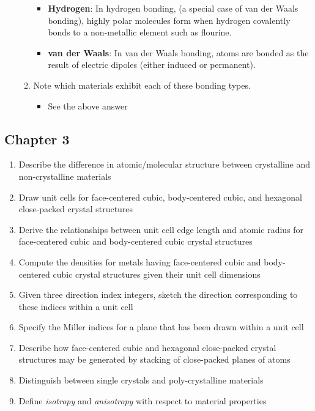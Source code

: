 \documentclass{article}
\begin{document}
\begin{enumerate}
\begin{enumerate}
\begin{itemize}
            \item \textbf{Hydrogen}: In hydrogen bonding, (a special case of van der Waals bonding), highly polar molecules form when hydrogen covalently bonds to a non-metallic element such as flourine.
            \item \textbf{van der Waals}: In van der Waals bonding, atoms are bonded as the result of electric dipoles (either induced or permanent).
        \end{itemize}
        \item Note which materials exhibit each of these bonding types.
        \begin{itemize}
            \item See the above answer
        \end{itemize}
    \end{enumerate}
\end{enumerate}

\subsection{Chapter 3}

\begin{enumerate}
    \item Describe the difference in atomic/molecular structure between crystalline and non-crystalline materials
    \item Draw unit cells for face-centered cubic, body-centered cubic, and hexagonal close-packed crystal structures
    \item Derive the relationships between unit cell edge length and atomic radius for face-centered cubic and body-centered cubic crystal structures
    \item Compute the densities for metals having face-centered cubic and body-centered cubic crystal structures given their unit cell dimensions
    \item Given three direction index integers, sketch the direction corresponding to these indices within a unit cell
    \item Specify the Miller indices for a plane that has been drawn within a unit cell
    \item Describe how face-centered cubic and hexagonal close-packed crystal structures may be generated by stacking of close-packed planes of atoms
    \item Distinguish between single crystals and poly-crystalline materials
    \item Define \textit{isotropy} and \textit{anisotropy} with respect to material properties
\end{enumerate}
\end{document}
